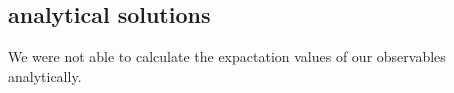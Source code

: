 \documentclass{scrartcl}
\begin{document}
\subsection{analytical solutions}
We were not able to calculate the expactation values of our observables analytically.
%	
%	
%	
%	
\end{document}
